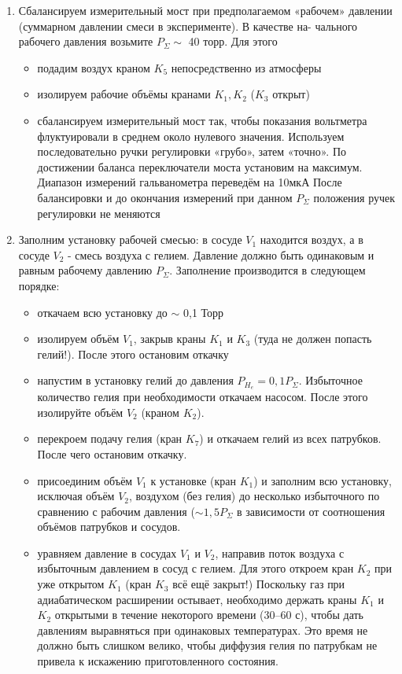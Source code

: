 \documentclass{article}
\begin{document}
\begin{enumerate}
\item Сбалансируем измерительный мост при предполагаемом «рабочем»
давлении (суммарном давлении смеси в эксперименте). В качестве на-
чального рабочего давления возьмите $P_\Sigma \sim$ 40 торр. Для этого
\begin{itemize}
\item подадим воздух краном $K_5$ непосредственно из атмосферы
\item изолируем рабочие объёмы кранами $K_1, K_2$ ($K_3$ открыт)
\item сбалансируем измерительный мост так, чтобы показания вольтметра флуктуировали в среднем около нулевого значения. Используем последовательно ручки регулировки «грубо», затем «точно». По достижении баланса переключатели моста установим на максимум. Диапазон измерений гальванометра переведём на 10мкА После балансировки и до окончания измерений при данном $P_\Sigma$ положения ручек регулировки не меняются
\end{itemize}
\item Заполним установку рабочей смесью: в сосуде $V_1$ находится воздух, а в сосуде $V_2$ - смесь воздуха с гелием. Давление должно быть одинаковым и равным рабочему давлению $P_\Sigma$. Заполнение производится в следующем порядке:
\begin{itemize}
\item откачаем всю установку до $\sim$ 0,1 Торр
\item изолируем объём $V_1$, закрыв краны $K_1$ и $K_3$ (туда не должен попасть гелий!). После этого остановим откачку
\item напустим в установку гелий до давления $P_H_e = 0,1 P_\Sigma$. Избыточное количество гелия при необходимости откачаем насосом. После этого изолируйте объём $V_2$ (краном $K_2$).
\item перекроем подачу гелия (кран $K_7$) и откачаем гелий из всех патрубков. После чего остановим откачку.
\item присоединим объём $V_1$ к установке (кран $K_1$) и заполним всю установку, исключая объём $V_2$, воздухом (без гелия) до несколько избыточного по сравнению с рабочим давления ($\sim 1,5 P_\Sigma $ в зависимости от соотношения объёмов патрубков и сосудов.
\item уравняем давление в сосудах $V_1$ и $V_2$, направив поток воздуха с избыточным давлением в сосуд с гелием. Для этого откроем кран $K_2$
при уже открытом $K_1$ (кран $K_3$ всё ещё закрыт!) Поскольку газ при адиабатическом расширении остывает, необходимо держать краны $K_1$ и $K_2$ открытыми в течение некоторого времени (30–60 с), чтобы дать давлениям выравняться при одинаковых температурах. Это время не должно быть слишком велико, чтобы диффузия гелия по патрубкам не привела к искажению приготовленного состояния.

\end{itemize}
\end{enumerate}
\end{document}
